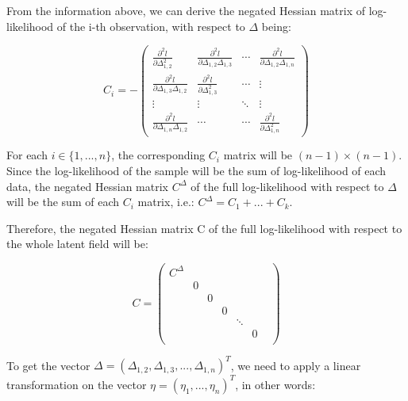 \documentclass[]{article}
\begin{document}
From the information above, we can derive the negated Hessian matrix of
log-likelihood of the i-th observation, with respect to \(\Delta\)
being:

\begin{equation}
C_{i} = -\begin{pmatrix}
\frac{\partial^{2}l}{\partial \Delta_{1,2}^{2}} & \frac{\partial^{2}l}{\partial \Delta_{1,2}\Delta_{1,3}} & \cdots & \frac{\partial^{2}l}{\partial \Delta_{1,2}\Delta_{1,n}} \\
\frac{\partial^{2}l}{\partial \Delta_{1,3}\Delta_{1,2}} & \frac{\partial^{2}l}{\partial \Delta_{1,3}^2} & \cdots & \vdots \\
\vdots & \vdots & \ddots & \vdots \\
\frac{\partial^{2}l}{\partial \Delta_{1,n}\Delta_{1,2}} & \cdots & \cdots & \frac{\partial^{2}l}{\partial \Delta_{1,n}^2}
\end{pmatrix}
\end{equation}

For each \(i \in\{1,...,n\}\), the corresponding \(C_i\) matrix will be
\((n-1)\times(n-1)\). Since the log-likelihood of the sample will be the
sum of log-likelihood of each data, the negated Hessian matrix
\(C^\Delta\) of the full log-likelihood with respect to \(\Delta\) will
be the sum of each \(C_i\) matrix, i.e.: \(C^\Delta = C_1 + ...+C_k\).

Therefore, the negated Hessian matrix C of the full log-likelihood with
respect to the whole latent field will be:

\begin{equation}\label{eqn:thehessian}
C = \begin{pmatrix}
C^{\Delta} & & & & & \\
& 0 & & & & \\
& & 0 & & & \\
& & & 0 & & \\
& & & & \ddots & & \\
& & & & & 0 \\
\end{pmatrix}
\end{equation}

To get the vector
\(\Delta=(\Delta_{1,2},\Delta_{1,3},..., \Delta_{1,n})^T\), we need to
apply a linear transformation on the vector
\(\eta=(\eta_1,...,\eta_n)^T\), in other words:
\end{document}
